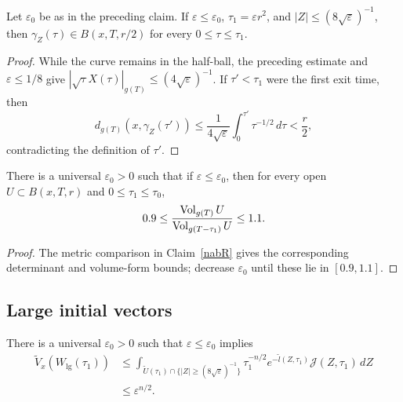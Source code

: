 \begin{claim}
\label{claim:l-geodesic-stays-in-ball}
\label{inside}

Let $\varepsilon_0$ be as in the preceding claim. If
$\varepsilon\leq\varepsilon_0$, $\tau_1=\varepsilon r^2$, and
$|Z|\leq(8\sqrt\varepsilon)^{-1}$, then
$\gamma_Z(\tau)\in B(x,T,r/2)$ for every $0\leq\tau\leq\tau_1$.
\end{claim}

\begin{proof}
\sketch
{}
While the curve remains in the half-ball, the preceding estimate and
$\varepsilon\leq1/8$ give
$|\sqrt\tau X(\tau)|_{g(T)}\leq(4\sqrt\varepsilon)^{-1}$. If $\tau'<\tau_1$
were the first exit time, then
\[
  d_{g(T)}(x,\gamma_Z(\tau'))
  \leq\frac1{4\sqrt\varepsilon}
  \int_0^{\tau'}\tau^{-1/2}\,d\tau
  <\frac r2,
\]
contradicting the definition of $\tau'$.
\end{proof}

\begin{claim}
\label{claim:volume-comparison-time-slices}
\label{volvomp}

There is a universal $\varepsilon_0>0$ such that if
$\varepsilon\leq\varepsilon_0$, then for every open
$U\subset B(x,T,r)$ and $0\leq\tau_1\leq\tau_0$,
\[
  0.9\leq
  \frac{\operatorname{Vol}_{g(T)}U}{\operatorname{Vol}_{g(T-\tau_1)}U}
  \leq1.1.
\]
\end{claim}

\begin{proof}
\sketch
{}
The metric comparison in Claim~\ref{nabR} gives the corresponding determinant
and volume-form bounds; decrease $\varepsilon_0$ until these lie in
$[0.9,1.1]$.
\end{proof}

\subsection{Large initial vectors}

\begin{lemma}
\label{lem:reduced-volume-large-directions}
\label{large}

There is a universal $\varepsilon_0>0$ such that
$\varepsilon\leq\varepsilon_0$ implies
\[
\begin{split}
  \widetilde V_x(W_{\mathrm{lg}}(\tau_1))
  &\leq
  \int_{\widetilde U(\tau_1)\cap
  \{|Z|\geq(8\sqrt\varepsilon)^{-1}\}}
  \tau_1^{-n/2}e^{-\widetilde l(Z,\tau_1)}
  {\mathcal J}(Z,\tau_1)\,dZ\\
  &\leq\varepsilon^{n/2}.
\end{split}
\]
\end{lemma}

